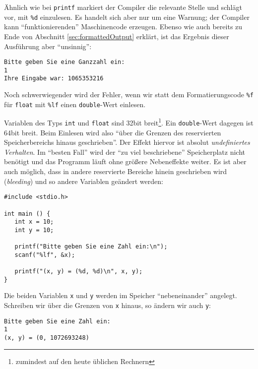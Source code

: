 Ähnlich wie bei \texttt{printf} markiert der Compiler die relevante Stelle und schlägt vor, mit \texttt{\%d} einzulesen. Es handelt sich aber nur um eine Warnung; der Compiler kann \enquote{funktionierenden} Maschinencode erzeugen. Ebenso wie auch bereits zu Ende von Abschnitt \ref{sec:formattedOutput} erklärt, ist das Ergebnis dieser Ausführung aber \enquote{unsinnig}:

\begin{cmdbox}
\begin{verbatim}
Bitte geben Sie eine Ganzzahl ein:
1
Ihre Eingabe war: 1065353216
\end{verbatim}
\end{cmdbox}

Noch schwerwiegender wird der Fehler, wenn wir statt dem Formatierungscode \texttt{\%f} für \texttt{float} mit \texttt{\%lf} einen \texttt{double}-Wert einlesen.

Variablen des Typs \texttt{int} und \texttt{float} sind 32bit breit\footnote{zumindest auf den heute üblichen Rechnern}. Ein \texttt{double}-Wert dagegen ist 64bit breit. Beim Einlesen wird also \enquote{über die Grenzen des reservierten Speicherbereichs hinaus geschrieben}. Der Effekt hiervor ist absolut \emph{undefiniertes Verhalten}. Im \enquote{besten Fall} wird der \enquote{zu viel beschriebene} Speicherplatz nicht benötigt und das Programm läuft ohne größere Nebeneffekte weiter. Es ist aber auch möglich, dass in andere reservierte Bereiche hinein geschrieben wird (\emph{bleeding}) und so andere Variablen geändert werden:

\begin{warnbox}[Beispiel: Fehler bei \texttt{scanf}: bleeding, leftupper=7mm]
\begin{verbatim}
#include <stdio.h>

int main () {
   int x = 10;
   int y = 10;
   
   printf("Bitte geben Sie eine Zahl ein:\n");
   scanf("%lf", &x);
   
   printf("(x, y) = (%d, %d)\n", x, y);
}
\end{verbatim}
\end{warnbox}

Die beiden Variablen \texttt{x} und \texttt{y} werden im Speicher \enquote{nebeneinander} angelegt. Schreiben wir über die Grenzen von \texttt{x} hinaus, so ändern wir auch \texttt{y}:

\begin{cmdbox}
\begin{verbatim}
Bitte geben Sie eine Zahl ein:
1
(x, y) = (0, 1072693248)
\end{verbatim}
\end{cmdbox}

